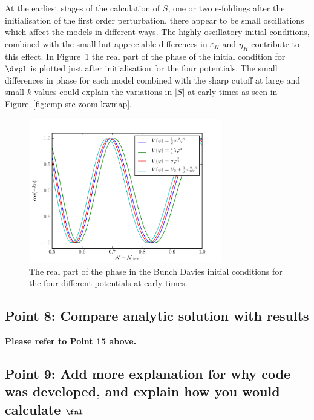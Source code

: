 At the earliest stages of the calculation of $S$, one or two e-foldings after the initialisation of
the first order perturbation, there appear to be small oscillations which affect the models in
different ways. The highly oscillatory initial conditions, combined with the small but appreciable
differences in $\varepsilon_H$ and $\eta_H$ contribute to this effect. In
Figure~\ref{fig:cos-keta-corr} the real part of the phase of the initial condition for $\dvp1$ is
plotted just after initialisation for the four potentials. The small differences in phase for each
model combined with the sharp cutoff at large and small $k$ values could explain the variations
in $|S|$ at early times as seen in Figure~\ref{fig:cmp-src-zoom-kwmap}. 

\begin{figure}
 \centering
 \includegraphics[width=0.75\textwidth]{numerical/graphs/cos_keta_kwmap_zoom-large.pdf}
 \caption{The real part of the phase in the Bunch Davies initial conditions for the four different
potentials at early times.}
 \label{fig:cos-keta-corr}
\end{figure}

\subsection{Point 8: Compare analytic solution with results}
\textbf{Please refer to Point 15 above.}

\subsection{Point 9: Add more explanation for why code was developed, and explain how
you would calculate \texorpdfstring{$\fnl$}{fNL}}

